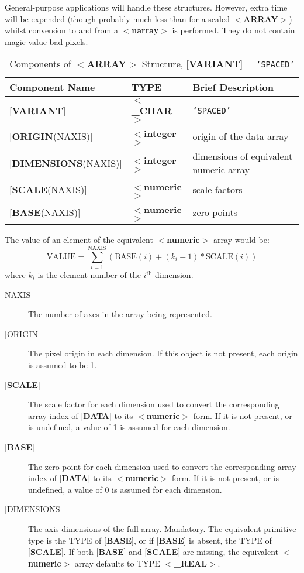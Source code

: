 \documentclass[twoside,11pt,nolof,noabs]{starlink}
\begin{document}
General-purpose applications will handle these structures.  However,
extra time will be expended (though probably much less than for a
scaled \mbox{$<$\textbf{ARRAY}$>$}) whilst conversion to
and from a $<$\textbf{narray}$>$ is performed.
They do not contain magic-value bad pixels.

\begin{table}
\centering
\caption{Components of $<$\textbf{ARRAY}$>$ Structure,
{[}\textbf{VARIANT}{]} = \texttt{`SPACED'}}
\begin{tabular}{|l|l|l|}
\hline
Component Name & TYPE & Brief Description \\  \hline
{[}\textbf{VARIANT}{]} & $<$\textbf{\_CHAR}$>$ & \texttt{`SPACED'} \\
{[}\textbf{ORIGIN}(NAXIS){]} & $<$\textbf{integer}$>$ & origin of the data array \\
{[}\textbf{DIMENSIONS}(NAXIS){]} & $<$\textbf{integer}$>$ & dimensions of equivalent numeric array\\
{[}\textbf{SCALE}(NAXIS){]} & $<$\textbf{numeric}$>$ & scale factors \\
{[}\textbf{BASE}(NAXIS){]} & $<$\textbf{numeric}$>$ & zero points \\ \hline
\end{tabular}
\end{table}

The value of an element of the equivalent
$<$\textbf{numeric}$>$ array would be:
$$\mathrm{VALUE} = \sum_{i=1}^{\mathrm{NAXIS}} (\mathrm{BASE}(i) + (k_i-1) * \mathrm{SCALE}(i) ) $$
where $k_i$ is the element number of the $i^{\mathrm{th}}$ dimension.
\begin{description}
\item [NAXIS]
The number of axes in the array being represented.
\item [{[}ORIGIN{]}]
The pixel origin in each dimension.  If this object is not present,
each origin is assumed to be 1.
\item [{[}\textbf{SCALE}{]}]
The scale factor for each dimension used to convert the corresponding
array index of {[}\textbf{DATA}{]} to its
$<$\textbf{numeric}$>$ form.  If it is not present, or is undefined,
a value of 1 is assumed for each dimension.
\item [{[}\textbf{BASE}{]}]
The zero point for each dimension used to convert the corresponding
array index of {[}\textbf{DATA}{]} to its
$<$\textbf{numeric}$>$ form.  If it is not present, or is undefined, a value of 0
is assumed for each dimension.
\item [{[}DIMENSIONS{]}]
The axis dimensions of the full array.  Mandatory.
The equivalent primitive type
is the TYPE of {[}\textbf{BASE}{]}, or if {[}\textbf{BASE}{]} is
absent, the TYPE of {[}\textbf{SCALE}{]}.  If both
{[}\textbf{BASE}{]} and {[}\textbf{SCALE}{]} are missing, the
equivalent $<$\textbf{numeric}$>$ array defaults to
TYPE $<$\textbf{\_REAL}$>$.
\end{description}
\end{document}
